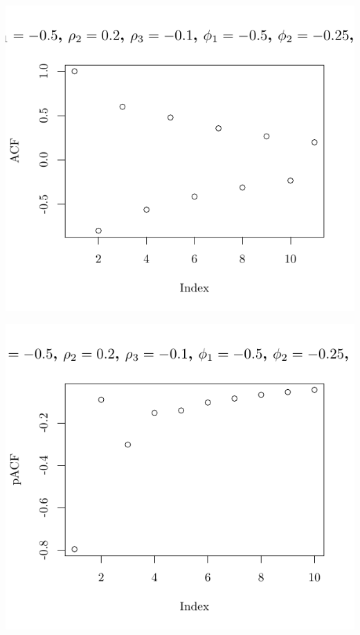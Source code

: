 \documentclass[10pt]{paper}\usepackage[]{graphicx}\usepackage[]{color}
\makeatletter
\def\maxwidth{ %
  \ifdim\Gin@nat@width>\linewidth
    \linewidth
  \else
    \Gin@nat@width
  \fi
}
\newenvironment{knitrout}{}{} %
\makeatother
\begin{document}
\begin{knitrout}
{\centering \includegraphics[width=\maxwidth]{figure/graphics-plotter-161} 

}




{\centering \includegraphics[width=\maxwidth]{figure/graphics-plotter-162} 

}





\end{knitrout}
\end{document}
